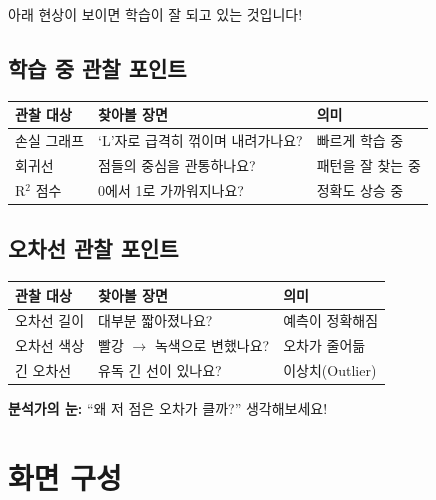 \documentclass[11pt, a4paper]{article}
\begin{document}
\begin{infobox}
아래 현상이 보이면 학습이 잘 되고 있는 것입니다!
\end{infobox}

\subsection{학습 중 관찰 포인트}

\begin{center}
\begin{tabular}{lp{6cm}l}
    \toprule
    \textbf{관찰 대상} & \textbf{찾아볼 장면} & \textbf{의미} \\
    \midrule
    손실 그래프 & `L'자로 급격히 꺾이며 내려가나요? & 빠르게 학습 중 \\
    회귀선 & 점들의 중심을 관통하나요? & 패턴을 잘 찾는 중 \\
    R$^2$ 점수 & 0에서 1로 가까워지나요? & 정확도 상승 중 \\
    \bottomrule
\end{tabular}
\end{center}

\subsection{오차선 관찰 포인트}

\begin{center}
\begin{tabular}{lp{6cm}l}
    \toprule
    \textbf{관찰 대상} & \textbf{찾아볼 장면} & \textbf{의미} \\
    \midrule
    오차선 길이 & 대부분 짧아졌나요? & 예측이 정확해짐 \\
    오차선 색상 & 빨강 $\rightarrow$ 녹색으로 변했나요? & 오차가 줄어듦 \\
    긴 오차선 & 유독 긴 선이 있나요? & 이상치(Outlier) \\
    \bottomrule
\end{tabular}
\end{center}

\begin{tipbox}
\textbf{분석가의 눈:} ``왜 저 점은 오차가 클까?'' 생각해보세요!
\end{tipbox}

\section{ 화면 구성}
\end{document}
